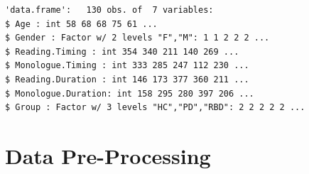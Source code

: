 \documentclass[
  english,
  doc,floatsintext]{apa6}
\begin{document}
\begin{table}[!htbp] \centering \renewcommand*{\arraystretch}{1.1}\caption{Summary of the Data Set used in this Analysis}\label{tab:summarize-data-frame}
\end{table}

\begin{verbatim}
'data.frame':   130 obs. of  7 variables:
$ Age : int 58 68 68 75 61 ...
$ Gender : Factor w/ 2 levels "F","M": 1 1 2 2 2 ...
$ Reading.Timing : int 354 340 211 140 269 ...
$ Monologue.Timing : int 333 285 247 112 230 ...
$ Reading.Duration : int 146 173 377 360 211 ...
$ Monologue.Duration: int 158 295 280 397 206 ...
$ Group : Factor w/ 3 levels "HC","PD","RBD": 2 2 2 2 2 ...
\end{verbatim}

\clearpage

\hypertarget{data-pre-processing}{%
\section{Data Pre-Processing}\label{data-pre-processing}}
\end{document}
